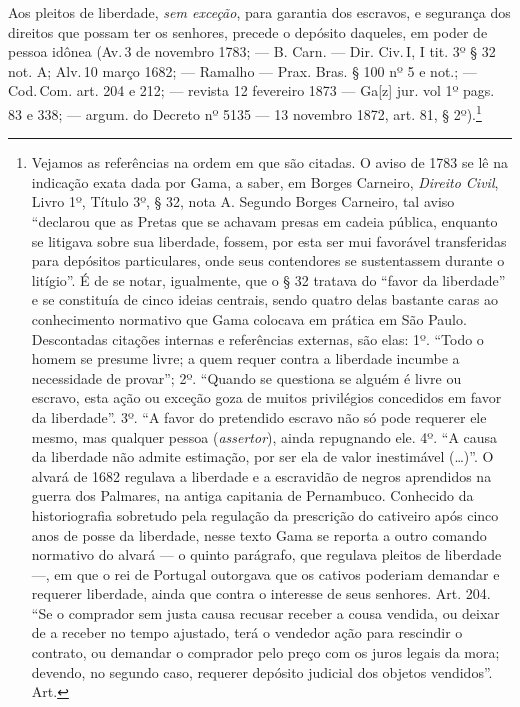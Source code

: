 Aos pleitos de liberdade, \emph{sem exceção}, para garantia dos
escravos, e segurança dos direitos que possam ter os senhores, precede o
depósito daqueles, em poder de pessoa idônea (Av.\,3 de novembro 1783; ---
B. Carn. --- Dir. Civ.\,I, I tit. 3º § 32 not. A; Alv.\,10 março 1682; ---
Ramalho --- Prax. Bras. § 100 nº 5 e not.; --- Cod.\,Com. art. 204 e 212; ---
revista 12 fevereiro 1873 --- Ga{[}z{]} jur. vol 1º pags. 83 e 338; ---
argum. do Decreto nº 5135 --- 13 novembro 1872, art. 81, § 2º).\footnote{
  Vejamos as referências na ordem em que são citadas. O aviso de 1783 se
  lê na indicação exata dada por Gama, a saber, em Borges Carneiro,
  \emph{Direito Civil}, Livro 1º, Título 3º, § 32, nota A. Segundo
  Borges Carneiro, tal aviso ``declarou que as Pretas que se achavam
  presas em cadeia pública, enquanto se litigava sobre sua liberdade,
  fossem, por esta ser mui favorável transferidas para depósitos
  particulares, onde seus contendores se sustentassem durante o
  litígio''. É de se notar, igualmente, que o § 32 tratava do ``favor da
  liberdade'' e se constituía de cinco ideias centrais, sendo quatro
  delas bastante caras ao conhecimento normativo que Gama colocava em
  prática em São Paulo. Descontadas citações internas e referências
  externas, são elas: 1º. ``Todo o homem se presume livre; a quem requer
  contra a liberdade incumbe a necessidade de provar''; 2º.
  ``Quando se questiona se alguém é livre ou escravo, esta ação ou
  exceção goza de muitos privilégios concedidos em favor da liberdade''.
  3º. ``A favor do pretendido escravo não só pode requerer ele mesmo, mas
  qualquer pessoa (\emph{assertor}), ainda repugnando ele. 4º. ``A causa
  da liberdade não admite estimação, por ser ela de valor inestimável
  (\ldots{})''. O alvará de 1682 regulava a liberdade e a escravidão de negros
  aprendidos na guerra dos Palmares, na antiga capitania de Pernambuco.
  Conhecido da historiografia sobretudo pela regulação da prescrição do
  cativeiro após cinco anos de posse da liberdade, nesse texto Gama se
  reporta a outro comando normativo do alvará --- o quinto parágrafo, que
  regulava pleitos de liberdade ---, em que o rei de Portugal outorgava que
  os cativos poderiam demandar e requerer liberdade, ainda que contra o
  interesse de seus senhores. Art. 204. ``Se o comprador sem justa causa
  recusar receber a cousa vendida, ou deixar de a receber no tempo
  ajustado, terá o vendedor ação para rescindir o contrato, ou demandar
  o comprador pelo preço com os juros legais da mora; devendo, no
  segundo caso, requerer depósito judicial dos objetos vendidos''. Art.
}
